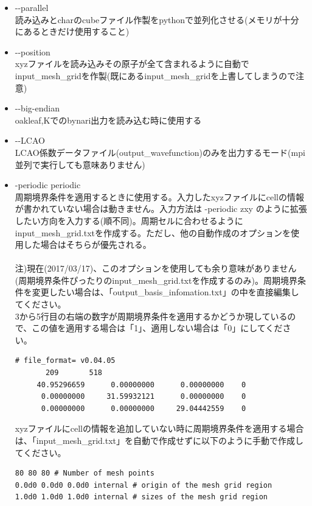 \documentclass{jsarticle}
\begin{document}
\begin{itemize}
\item -\--parallel\\
読み込みとcharのcubeファイル作製をpythonで並列化させる(メモリが十分にあるときだけ使用すること)\\
\item -\--position\\
xyzファイルを読み込みその原子が全て含まれるように自動でinput\_mesh\_gridを作製(既にあるinput\_mesh\_gridを上書してしまうので注意)\\
\item -\--big-endian\\
oakleaf,Kでのbynari出力を読み込む時に使用する\\
\item -\--LCAO\\
LCAO係数データファイル(output\_wavefunction)のみを出力するモード(mpi並列で実行しても意味ありません)\\
\item -periodic periodic\\
周期境界条件を適用するときに使用する。入力したxyzファイルにcellの情報が書かれていない場合は動きません。入力方法は -periodic zxy のように拡張したい方向を入力する(順不同)。周期セルに合わせるようにinput\_mesh\_grid.txtを作成する。ただし、他の自動作成のオプションを使用した場合はそちらが優先される。\\
\\
注)現在(2017/03/17)、このオプションを使用しても余り意味がありません(周期境界条件ぴったりのinput\_mesh\_grid.txtを作成するのみ)。周期境界条件を変更したい場合は、「output\_basis\_infomation.txt」の中を直接編集してください。\\
3から5行目の右端の数字が周期境界条件を適用するかどうか現しているので、この値を適用する場合は「1」、適用しない場合は「0」にしてください。
\begin{Verbatim}[frame=single]
# file_format= v0.04.05
       209       518
     40.95296659      0.00000000      0.00000000    0
      0.00000000     31.59932121      0.00000000    0
      0.00000000      0.00000000     29.04442559    0
\end{Verbatim}
xyzファイルにcellの情報を追加していない時に周期境界条件を適用する場合は、「input\_mesh\_grid.txt」を自動で作成せずに以下のように手動で作成してください。\\
\begin{Verbatim}[frame=single]
80 80 80 # Number of mesh points
0.0d0 0.0d0 0.0d0 internal # origin of the mesh grid region
1.0d0 1.0d0 1.0d0 internal # sizes of the mesh grid region
\end{Verbatim}

\end{itemize}
\end{document}
